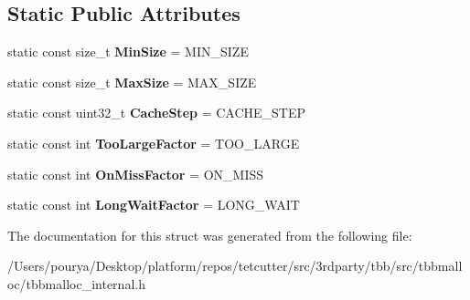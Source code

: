 \subsection*{Static Public Attributes}
\begin{DoxyCompactItemize}
\item 
\hypertarget{structrml_1_1internal_1_1LargeObjectCacheProps_ab1a2bbb908200bb1140d322c492a0a79}{}static const size\+\_\+t {\bfseries Min\+Size} = M\+I\+N\+\_\+\+S\+I\+Z\+E\label{structrml_1_1internal_1_1LargeObjectCacheProps_ab1a2bbb908200bb1140d322c492a0a79}

\item 
\hypertarget{structrml_1_1internal_1_1LargeObjectCacheProps_a0ed0000a0692e4e0acae087670c00917}{}static const size\+\_\+t {\bfseries Max\+Size} = M\+A\+X\+\_\+\+S\+I\+Z\+E\label{structrml_1_1internal_1_1LargeObjectCacheProps_a0ed0000a0692e4e0acae087670c00917}

\item 
\hypertarget{structrml_1_1internal_1_1LargeObjectCacheProps_a6d1fad258754941545a74f5bbd888bde}{}static const uint32\+\_\+t {\bfseries Cache\+Step} = C\+A\+C\+H\+E\+\_\+\+S\+T\+E\+P\label{structrml_1_1internal_1_1LargeObjectCacheProps_a6d1fad258754941545a74f5bbd888bde}

\item 
\hypertarget{structrml_1_1internal_1_1LargeObjectCacheProps_acbcc859e5354b5203c5b3ec46ad5cbaa}{}static const int {\bfseries Too\+Large\+Factor} = T\+O\+O\+\_\+\+L\+A\+R\+G\+E\label{structrml_1_1internal_1_1LargeObjectCacheProps_acbcc859e5354b5203c5b3ec46ad5cbaa}

\item 
\hypertarget{structrml_1_1internal_1_1LargeObjectCacheProps_a376d3f6dbca4b3f5702cd2a58ba0dcfe}{}static const int {\bfseries On\+Miss\+Factor} = O\+N\+\_\+\+M\+I\+S\+S\label{structrml_1_1internal_1_1LargeObjectCacheProps_a376d3f6dbca4b3f5702cd2a58ba0dcfe}

\item 
\hypertarget{structrml_1_1internal_1_1LargeObjectCacheProps_a361a6a74d4e8f5249b58545375a44606}{}static const int {\bfseries Long\+Wait\+Factor} = L\+O\+N\+G\+\_\+\+W\+A\+I\+T\label{structrml_1_1internal_1_1LargeObjectCacheProps_a361a6a74d4e8f5249b58545375a44606}

\end{DoxyCompactItemize}


The documentation for this struct was generated from the following file\+:\begin{DoxyCompactItemize}
\item 
/\+Users/pourya/\+Desktop/platform/repos/tetcutter/src/3rdparty/tbb/src/tbbmalloc/tbbmalloc\+\_\+internal.\+h\end{DoxyCompactItemize}
